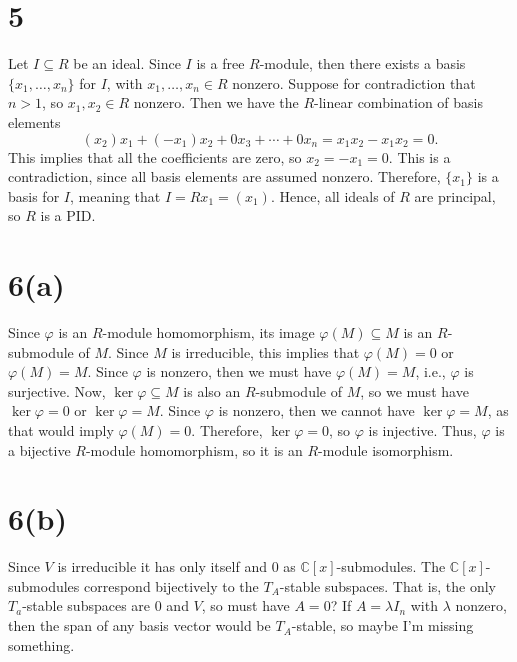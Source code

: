 \documentclass[12pt]{article}
\theoremstyle{definition}
\newcommand{\C}{\mathbb{C}}
\renewcommand{\phi}{\varphi}
\begin{document}
\newpage
\section*{5}

Let $I \subseteq R$ be an ideal. Since $I$ is a free $R$-module, then there exists a basis $\{x_1, \dots, x_n\}$ for $I$, with $x_1, \dots, x_n \in R$ nonzero. Suppose for contradiction that $n > 1$, so $x_1, x_2 \in R$ nonzero. Then we have the $R$-linear combination of basis elements
\[
    (x_2)x_1 + (-x_1)x_2 + 0x_3 + \cdots + 0x_n = x_1x_2 - x_1x_2 = 0.
\]
This implies that all the coefficients are zero, so $x_2 = -x_1 = 0$. This is a contradiction, since all basis elements are assumed nonzero. Therefore, $\{x_1\}$ is a basis for $I$, meaning that $I = Rx_1 = (x_1)$. Hence, all ideals of $R$ are principal, so $R$ is a PID.

\section*{6(a)}

Since $\phi$ is an $R$-module homomorphism, its image $\phi(M) \subseteq M$ is an $R$-submodule of $M$. Since $M$ is irreducible, this implies that $\phi(M) = 0$ or $\phi(M) = M$. Since $\phi$ is nonzero, then we must have $\phi(M) = M$, i.e., $\phi$ is surjective. Now, $\ker\phi \subseteq M$ is also an $R$-submodule of $M$, so we must have $\ker\phi = 0$ or $\ker\phi = M$. Since $\phi$ is nonzero, then we cannot have $\ker\phi = M$, as that would imply $\phi(M) = 0$. Therefore, $\ker\phi = 0$, so $\phi$ is injective. Thus, $\phi$ is a bijective $R$-module homomorphism, so it is an $R$-module isomorphism.

\section*{6(b)}

Since $V$ is irreducible it has only itself and $0$ as $\C[x]$-submodules. The $\C[x]$-submodules correspond bijectively to the $T_A$-stable subspaces. That is, the only $T_a$-stable subspaces are $0$ and $V$, so must have $A = 0$? If $A = \lambda I_n$ with $\lambda$ nonzero, then the span of any basis vector would be $T_A$-stable, so maybe I'm missing something.
\end{document}
